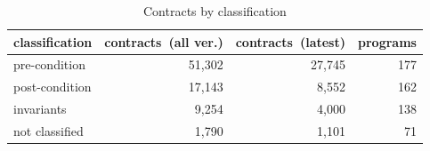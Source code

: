 \begin{table}[]
\centering
\caption{Contracts by classification}
\label{tab:contractsbyclassification}
\begin{tabular}{|p{2.1cm}|r|r|r|} \hline
   classification & \parbox{1.2cm}{contracts\ (all ver.)} & \parbox{1.2cm}{contracts\ (latest)} & programs \\ \hline
	pre-condition &  51,302 & 
27,745 & 
177 \\ 
	post-condition &  17,143 & 
8,552 & 
162 \\ 
	invariants &  9,254 & 
4,000 & 
138 \\ 
	not classified &  1,790 & 
1,101 & 
71 \\ 
\hline
\end{tabular}
\end{table}

